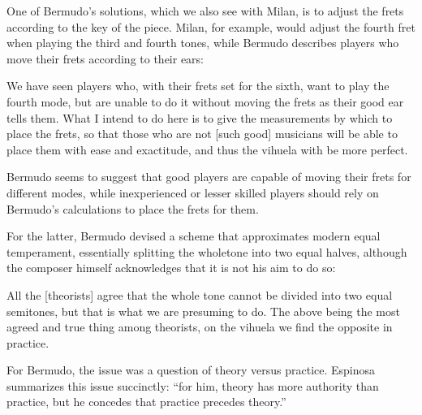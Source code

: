 One of Bermudo's solutions, which we also see with Milan, is to adjust the frets
according to the key of the piece.  Milan, for example, would adjust the fourth fret
when playing the third and fourth tones, while Bermudo describes players who move their
frets according to their ears:
\begin{blocks}
We have seen players who, with their frets set for the sixth, want to play the fourth
mode, but are unable to do it without moving the frets as their good ear tells them.
What I intend to do here is to give the measurements by which to place the frets, so
that those who are not [such good] musicians will be able to place them with ease and
exactitude, and thus the vihuela with be more perfect.
\autocite[78]{DE:1}
\end{blocks}
Bermudo seems to suggest that good players are capable of moving their frets
for different modes, while inexperienced or lesser skilled players should
rely on Bermudo's calculations to place the frets for them.

For the latter, Bermudo devised a scheme that approximates modern equal temperament,
essentially splitting the wholetone into two equal halves, although the
composer himself acknowledges that it is not his aim to do so:
\begin{blocks}
All the [theorists] agree that the whole tone cannot be divided into two equal
semitones, but that is what we are presuming to do.  The above being the most agreed
and true thing among theorists, on the vihuela we find the opposite in practice.
\autocite[xx]{DE:1}
\end{blocks}
For Bermudo, the issue was a question of theory versus practice.  Espinosa summarizes
this issue succinctly: ``for him, theory has more authority than practice, but he
concedes that practice precedes theory.'' \autocite[xx]{DE:1}

